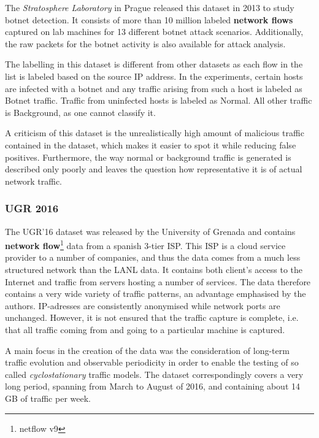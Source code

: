 \documentclass[a4paper,12pt,twoside]{report}
\begin{document}
The \textit{Stratosphere Laboratory} in Prague released this dataset in 2013 to study botnet detection. It consists of more than 10 million labeled \textbf{network flows} captured on lab machines for 13 different botnet attack scenarios. Additionally, the raw packets for the botnet activity is also available for attack analysis. 

The labelling in this dataset is different from other datasets as each  flow  in  the  list  is  labeled  based  on  the  source  IP  address.  In  the experiments,  certain  hosts  are  infected  with  a  botnet  and  any  traffic  arising from such a host is labeled as Botnet traffic. Traffic from uninfected hosts is labeled as Normal. All other traffic is Background, as one cannot classify it. 

A criticism of this dataset is the unrealistically high amount of malicious traffic contained in the dataset, which makes it easier to spot it while reducing false positives. Furthermore, the way normal or background traffic is generated is described only poorly and leaves the question how representative it is of actual network traffic.

\subsubsection*{UGR 2016 \cite{macia2018ugr}}

The UGR'16 dataset was released by the University of Grenada and contains \textbf{network flow}\footnote{netflow v9} data from a spanish 3-tier ISP. This ISP is a cloud service provider to a number of companies, and thus the data comes from a much less structured network than the LANL data. It contains both client's access to the Internet and traffic from servers hosting a number of services. The data therefore contains a very wide variety of traffic patterns, an advantage emphasised by the authors. IP-adresses are consistently anonymised while network ports are unchanged. However, it is not ensured that the traffic capture is complete, i.e. that all traffic coming from and going to a particular machine is captured.

A main focus in the creation of the data was the consideration of long-term traffic evolution and observable periodicity in order to enable the testing of so called \textit{cyclostationary} traffic models. The dataset correspondingly covers a very long period, spanning from March to August of 2016, and containing about 14 GB of traffic per week. 
\end{document}

